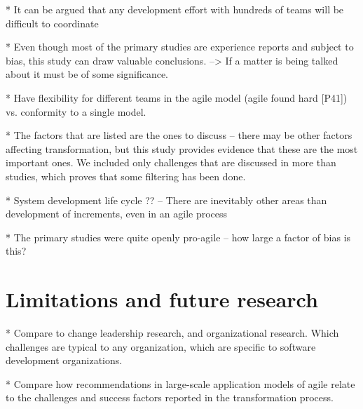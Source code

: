 \documentclass[preprint,authoryear,12pt]{elsarticle}
\begin{document}
* It can be argued that any development effort with hundreds of teams will be
  difficult to coordinate

* Even though most of the primary studies are experience reports and subject to
  bias, this study can draw valuable conclusions. --> If a matter is being
  talked about it must be of some significance.

* Have flexibility for different teams in the agile model (agile found
  hard [P41]) vs. conformity to a single model. 

* The factors that are listed are the ones to discuss -- there may be other
  factors affecting transformation, but this study provides evidence that these
  are the most important ones. We included only challenges that are discussed in
  more than studies, which proves that some filtering has been done.

* System development life cycle ?? -- There are inevitably other areas than
  development of increments, even in an agile process

* The primary studies were quite openly pro-agile -- how large a factor of bias
  is this?

\section{Limitations and future research}
\label{sec:conclusion}

* Compare to change leadership research, and organizational research. Which
  challenges are typical to any organization, which are specific to software
  development organizations.

* Compare how recommendations in large-scale application models of agile relate
  to the challenges and success factors reported in the transformation process. 






\end{document}
